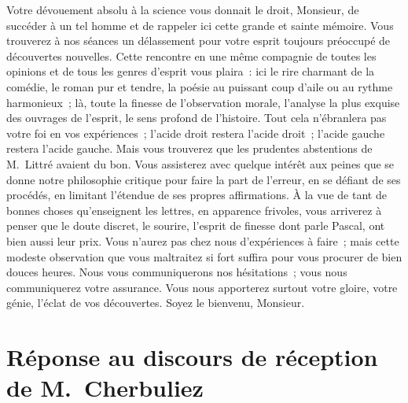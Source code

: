 \documentclass[french,twoside]{book} %
\newcommand\persName[1]{#1}
\newcommand{\dateline}[1]{\medskip{\RaggedLeft{#1}\par}\bigskip}
\begin{document}
Votre dévouement absolu à la science vous donnait le droit, Monsieur, de succéder à un tel homme et de rappeler ici cette grande et sainte mémoire. Vous trouverez à nos séances un délassement pour votre esprit toujours préoccupé de découvertes nouvelles. Cette rencontre en une même compagnie de toutes les opinions et de tous les genres d’esprit vous plaira : ici le rire charmant de la comédie, le roman pur et tendre, la poésie au puissant coup d’aile ou au rythme harmonieux ; là, toute la finesse de l’observation morale, l’analyse la plus exquise des ouvrages de l’esprit, le sens profond de l’histoire. Tout cela n’ébranlera pas votre foi en vos expériences ; l’acide droit restera l’acide droit ; l’acide gauche restera l’acide gauche. Mais vous trouverez que les prudentes abstentions de {\persName M. Littré} avaient du bon. Vous assisterez avec quelque intérêt aux peines que se donne notre philosophie critique pour faire la part de l’erreur, en se défiant de ses procédés, en limitant l’étendue de ses propres affirmations. À la vue de tant de bonnes choses qu’enseignent les lettres, en apparence frivoles, vous arriverez à penser que le doute discret, le sourire, l’esprit de finesse dont parle {\persName Pascal}, ont bien aussi leur prix. Vous n’aurez pas chez nous d’expériences à faire ; mais cette modeste observation que vous maltraitez si fort suffira pour vous procurer de bien douces heures. Nous vous communiquerons nos hésitations ; vous nous communiquerez votre assurance. Vous nous apporterez surtout votre gloire, votre génie, l’éclat de vos découvertes. Soyez le bienvenu, Monsieur.
\section[{Réponse au discours de réception de M. Cherbuliez}]{Réponse au discours de réception de {\persName M. Cherbuliez}}\renewcommand{\leftmark}{Réponse au discours de réception de {\persName M. Cherbuliez}}


\dateline{25 mai 1882}
\end{document}
